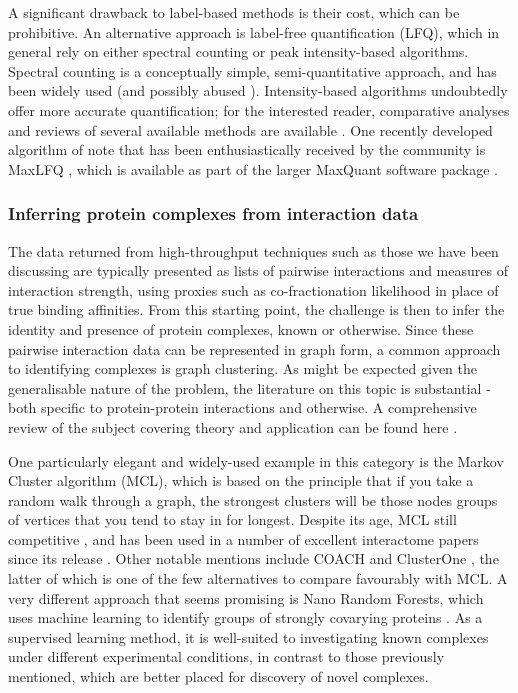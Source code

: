 \documentclass[a4paper,11pt,twoside,openright]{scrbook}
\begin{document}
A significant drawback to label-based methods is their cost, which can be prohibitive. An alternative approach is label-free quantification (LFQ), which in general rely on either spectral counting \cite{Liu2004,Zybailov2005} or peak intensity-based algorithms. Spectral counting is a conceptually simple, semi-quantitative approach, and has been widely used (and possibly abused \cite{Lundgren2010}). Intensity-based algorithms undoubtedly offer more accurate quantification; for the interested reader, comparative analyses and reviews of several available methods are available \cite{Nahnsen2013,Fabre2014}. One recently developed algorithm of note that has been enthusiastically received by the community is MaxLFQ \cite{Cox2014}, which is available as part of the larger MaxQuant software package \cite{Cox2008}.

\subsubsection{Inferring protein complexes from interaction data}
The data returned from high-throughput techniques such as those we have been discussing are typically presented as lists of pairwise interactions and measures of interaction strength, using proxies such as co-fractionation likelihood in place of true binding affinities. From this starting point, the challenge is then to infer the identity and presence of protein complexes, known or otherwise. Since these pairwise interaction data can be represented in graph form, a common approach to identifying complexes is graph clustering. As might be expected given the generalisable nature of the problem, the literature on this topic is substantial - both specific to protein-protein interactions and otherwise. A comprehensive review of the subject covering theory and application can be found here \cite{Schaeffer2007}.

One particularly elegant and widely-used example in this category is the Markov Cluster algorithm \cite{VanDongen2000} (MCL), which is based on the principle that if you take a random walk through a graph, the strongest clusters will be those nodes groups of vertices that you tend to stay in for longest. Despite its age, MCL still competitive \cite{Li2010}, and has been used in a number of excellent interactome papers since its release \cite{Krogan2006,Wan2015}. Other notable mentions include COACH and ClusterOne \cite{Wu2009,Nepusz2012}, the latter of which is one of the few alternatives to compare favourably with MCL. A very different approach that seems promising is Nano Random Forests, which uses machine learning to identify groups of strongly covarying proteins \cite{Montano-Gutierrez2017}. As a supervised learning method, it is well-suited to investigating known complexes under different experimental conditions, in contrast to those previously mentioned, which are better placed for discovery of novel complexes.
\end{document}
